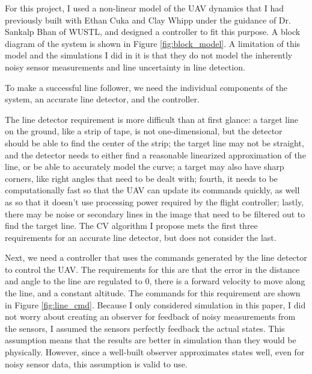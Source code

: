 \documentclass[10pt,twocolumn,letterpaper]{article}
\begin{document}
	For this project, I used a non-linear model of the UAV dynamics that I had previously built with Ethan Cuka and Clay Whipp under the guidance of Dr. Sankalp Bhan of WUSTL, and designed a controller to fit this purpose. A block diagram of the system is shown in Figure \ref{fig:block_model}. A limitation of this model and the simulations I did in it is that they do not model the inherently noisy sensor measurements and line uncertainty in line detection. 
	
	To make a successful line follower, we need the individual components of the system, an accurate line detector, and the controller. 
	
	The line detector requirement is more difficult than at first glance: a target line on the ground, like a strip of tape, is not one-dimensional, but the detector should be able to find the center of the strip; the target line may not be straight, and the detector needs to either find a reasonable linearized approximation of the line, or be able to accurately model the curve; a target may also have sharp corners, like right angles that need to be dealt with; fourth, it needs to be computationally fast so that the UAV can update its commands quickly, as well as so that it doesn't use processing power required by the flight controller; lastly, there may be noise or secondary lines in the image that need to be filtered out to find the target line. The CV algorithm I propose mets the first three requirements for an accurate line detector, but does not consider the last. 
	
	Next, we need a controller that uses the commands generated by the line detector to control the UAV. The requirements for this are that the error in the distance and angle to the line are regulated to 0, there is a forward velocity to move along the line, and a constant altitude. The commands for this requirement are shown in Figure \ref{fig:line_cmd}. Because I only considered simulation in this paper, I did not worry about creating an observer for feedback of noisy measurements from the sensors, I assumed the sensors perfectly feedback the actual states. This assumption means that the results are better in simulation than they would be physically. However, since a well-built observer approximates states well, even for noisy sensor data, this assumption is valid to use. 
	
\end{document}
